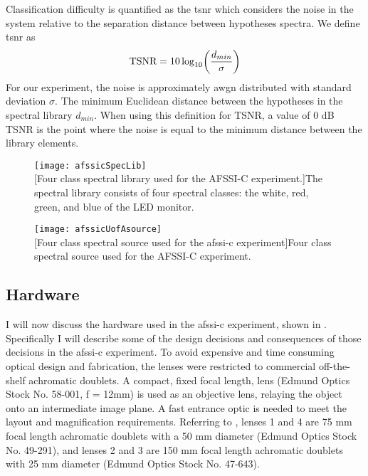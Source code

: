 Classification difficulty is quantified as the \acrfull{tsnr} which considers the noise in the system relative to the separation distance between hypotheses spectra. We define \gls{tsnr} as
%
\begin{equation}
\text{TSNR} = 10 \log_{10} \ap{ \frac{d_{min}}{\sigma} }
\end{equation}
%
For our experiment, the noise is approximately \gls{awgn} distributed with standard deviation $\sigma$. The minimum Euclidean distance between the hypotheses in the spectral library $d_{min}$. When using this definition for TSNR, a value of 0 dB TSNR is the point where the noise is equal to the minimum distance between the library elements.


\begin{figure}[htb]
	\centering
	\texttt{[image: afssicSpecLib]}\\
	[Four class spectral library used for the AFSSI-C experiment.]{The spectral library consists of four spectral classes: the white, red, green, and blue of the LED monitor.}
	\label{fig:afssicSpecLib}
\end{figure}


\begin{figure}[htb]
	\centering
	\texttt{[image: afssicUofAsource]}\\
	[Four class spectral source used for the \gls{afssi-c} experiment]{Four class spectral source used for the AFSSI-C experiment.}
	\label{fig:afssicUofAsource}
\end{figure}

\subsection{Hardware}

I will now discuss the hardware used in the \gls{afssi-c} experiment, shown in . Specifically I will describe some of the design decisions and consequences of those decisions in the \gls{afssi-c} experiment. To avoid expensive and time consuming optical design and fabrication, the lenses were restricted to commercial off-the-shelf achromatic doublets. A compact, fixed focal length, lens (Edmund Optics Stock No. 58-001, f = 12mm) is used as an objective lens, relaying the object onto an intermediate image plane. A fast entrance optic is needed to meet the layout and magnification requirements. Referring to , lenses 1 and 4 are 75 mm focal length achromatic doublets with a 50 mm diameter (Edmund Optics Stock No. 49-291), and lenses 2 and 3 are 150 mm focal length achromatic doublets with 25 mm diameter (Edmund Optics Stock No. 47-643). 

